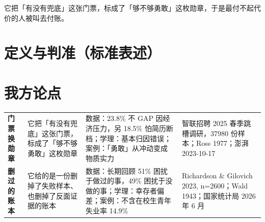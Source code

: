 \documentclass[quick,pro]{debate}
\begin{document}
\debatetitle
\begin{thesisbox}它把「有没有兜底」这张门票，标成了「够不够勇敢」这枚勋章，于是最付不起代价的人被叫去付账。\end{thesisbox}

\section{定义与判准（标准表述）}
\begin{fields}
\end{fields}

\section{我方论点}
\begin{tabularx}{\linewidth}{@{}L{4.6em}Y Y L{7em}@{}}\toprule
{}&&&\\\midrule
\textbf{门票换勋章}&它把「有没有兜底」这张门票，标成了「够不够勇敢」这枚勋章&数据：23.8\% 不 GAP 因经济压力，另 18.5\% 怕简历断档；学理：基本归因错误；案例：「勇敢」从冲动变成物质实力&智联招聘 2025 春季跳槽调研，37980 份样本；Ross 1977；澎湃 2023-10-17\\
\textbf{删过的账本}&它给的是一份删掉了失败样本、也删掉了反面证据的账本&数据：长期回顾 51\% 困扰于做过的事，49\% 困扰于没做的事；学理：幸存者偏差；案例：不含在校生青年失业率 14.9\%&Richardson \& Gilovich 2023, n=2600；Wald 1943；国家统计局 2026 年 6 月\\
\bottomrule\end{tabularx}
\end{document}

